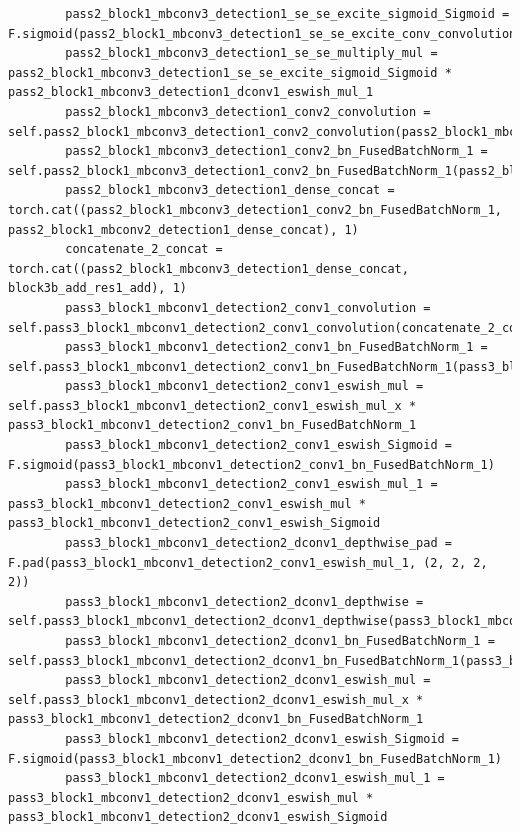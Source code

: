 \documentclass{fisatprojectfinal}
\begin{document}
\begin{appendices}
\begin{lstlisting}
        pass2_block1_mbconv3_detection1_se_se_excite_sigmoid_Sigmoid = F.sigmoid(pass2_block1_mbconv3_detection1_se_se_excite_conv_convolution)
        pass2_block1_mbconv3_detection1_se_se_multiply_mul = pass2_block1_mbconv3_detection1_se_se_excite_sigmoid_Sigmoid * pass2_block1_mbconv3_detection1_dconv1_eswish_mul_1
        pass2_block1_mbconv3_detection1_conv2_convolution = self.pass2_block1_mbconv3_detection1_conv2_convolution(pass2_block1_mbconv3_detection1_se_se_multiply_mul)
        pass2_block1_mbconv3_detection1_conv2_bn_FusedBatchNorm_1 = self.pass2_block1_mbconv3_detection1_conv2_bn_FusedBatchNorm_1(pass2_block1_mbconv3_detection1_conv2_convolution)
        pass2_block1_mbconv3_detection1_dense_concat = torch.cat((pass2_block1_mbconv3_detection1_conv2_bn_FusedBatchNorm_1, pass2_block1_mbconv2_detection1_dense_concat), 1)
        concatenate_2_concat = torch.cat((pass2_block1_mbconv3_detection1_dense_concat, block3b_add_res1_add), 1)
        pass3_block1_mbconv1_detection2_conv1_convolution = self.pass3_block1_mbconv1_detection2_conv1_convolution(concatenate_2_concat)
        pass3_block1_mbconv1_detection2_conv1_bn_FusedBatchNorm_1 = self.pass3_block1_mbconv1_detection2_conv1_bn_FusedBatchNorm_1(pass3_block1_mbconv1_detection2_conv1_convolution)
        pass3_block1_mbconv1_detection2_conv1_eswish_mul = self.pass3_block1_mbconv1_detection2_conv1_eswish_mul_x * pass3_block1_mbconv1_detection2_conv1_bn_FusedBatchNorm_1
        pass3_block1_mbconv1_detection2_conv1_eswish_Sigmoid = F.sigmoid(pass3_block1_mbconv1_detection2_conv1_bn_FusedBatchNorm_1)
        pass3_block1_mbconv1_detection2_conv1_eswish_mul_1 = pass3_block1_mbconv1_detection2_conv1_eswish_mul * pass3_block1_mbconv1_detection2_conv1_eswish_Sigmoid
        pass3_block1_mbconv1_detection2_dconv1_depthwise_pad = F.pad(pass3_block1_mbconv1_detection2_conv1_eswish_mul_1, (2, 2, 2, 2))
        pass3_block1_mbconv1_detection2_dconv1_depthwise = self.pass3_block1_mbconv1_detection2_dconv1_depthwise(pass3_block1_mbconv1_detection2_dconv1_depthwise_pad)
        pass3_block1_mbconv1_detection2_dconv1_bn_FusedBatchNorm_1 = self.pass3_block1_mbconv1_detection2_dconv1_bn_FusedBatchNorm_1(pass3_block1_mbconv1_detection2_dconv1_depthwise)
        pass3_block1_mbconv1_detection2_dconv1_eswish_mul = self.pass3_block1_mbconv1_detection2_dconv1_eswish_mul_x * pass3_block1_mbconv1_detection2_dconv1_bn_FusedBatchNorm_1
        pass3_block1_mbconv1_detection2_dconv1_eswish_Sigmoid = F.sigmoid(pass3_block1_mbconv1_detection2_dconv1_bn_FusedBatchNorm_1)
        pass3_block1_mbconv1_detection2_dconv1_eswish_mul_1 = pass3_block1_mbconv1_detection2_dconv1_eswish_mul * pass3_block1_mbconv1_detection2_dconv1_eswish_Sigmoid

\end{lstlisting}
\end{appendices}
\end{document}
